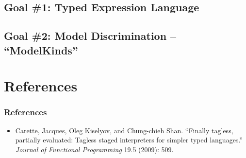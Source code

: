 \documentclass{beamer}
\begin{document}
\subsection{Goal \#1: Typed Expression Language}
\subsection{Goal \#2: Model Discrimination -- ``ModelKinds''}
\section{References}

\begin{frame}
    \frametitle{}
    \framesubtitle{}
\end{frame}

\begin{frame}
\frametitle{References}
\begin{itemize}
 \item Carette, Jacques, Oleg Kiselyov, and Chung-chieh Shan. ``Finally tagless, partially evaluated: Tagless staged interpreters for simpler typed languages.'' \textit{Journal of Functional Programming} 19.5 (2009): 509.
\end{itemize}

\end{frame}
\end{document}
